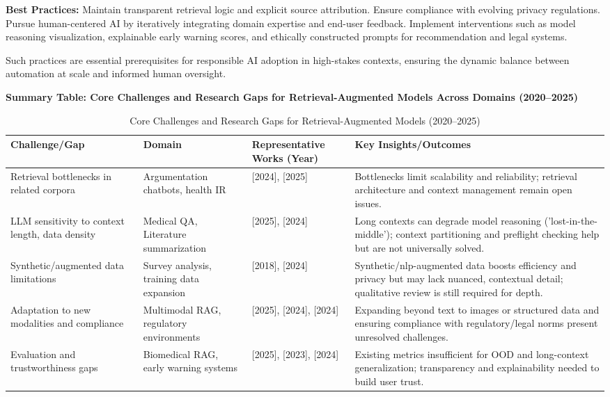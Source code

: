 \documentclass[sigconf]{acmart}
\begin{document}
\textbf{Best Practices:}
Maintain transparent retrieval logic and explicit source attribution.
Ensure compliance with evolving privacy regulations.
Pursue human-centered AI by iteratively integrating domain expertise and end-user feedback.
Implement interventions such as model reasoning visualization, explainable early warning scores, and ethically constructed prompts for recommendation and legal systems.

Such practices are essential prerequisites for responsible AI adoption in high-stakes contexts, ensuring the dynamic balance between automation at scale and informed human oversight.

\textbf{Summary Table: Core Challenges and Research Gaps for Retrieval-Augmented Models Across Domains (2020--2025)}

\begin{table*}[htbp]
\centering
\caption{Core Challenges and Research Gaps for Retrieval-Augmented Models (2020--2025)}
\label{tab:rag_challenges}
\begin{adjustbox}{max width=\textwidth}
\begin{tabular}{@{}llll@{}}
\toprule
\textbf{Challenge/Gap} & \textbf{Domain} & \textbf{Representative Works (Year)} & \textbf{Key Insights/Outcomes} \\
\midrule
Retrieval bottlenecks in related corpora & Argumentation chatbots, health IR & \cite{ref13}[2024], \cite{ref42}[2025] & Bottlenecks limit scalability and reliability; retrieval architecture and context management remain open issues. \\
LLM sensitivity to context length, data density & Medical QA, Literature summarization & \cite{ref49}[2025], \cite{ref6}[2024] & Long contexts can degrade model reasoning ('lost-in-the-middle'); context partitioning and preflight checking help but are not universally solved. \\
Synthetic/augmented data limitations & Survey analysis, training data expansion & \cite{ref56}[2018], \cite{ref57}[2024] & Synthetic/nlp-augmented data boosts efficiency and privacy but may lack nuanced, contextual detail; qualitative review is still required for depth. \\
Adaptation to new modalities and compliance & Multimodal RAG, regulatory environments & \cite{ref3}[2025], \cite{ref36}[2024], \cite{ref48}[2024] & Expanding beyond text to images or structured data and ensuring compliance with regulatory/legal norms present unresolved challenges. \\
Evaluation and trustworthiness gaps & Biomedical RAG, early warning systems & \cite{ref5}[2025], \cite{ref34}[2023], \cite{ref50}[2024] & Existing metrics insufficient for OOD and long-context generalization; transparency and explainability needed to build user trust. \\
\bottomrule
\end{tabular}
\end{adjustbox}
\end{table*}
\end{document}
